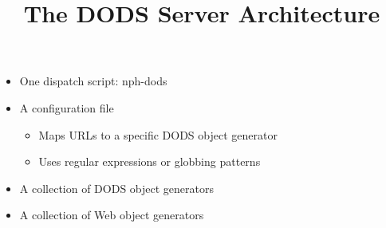 \title{The DODS Server Architecture}

\begin{itemize}
\item One dispatch script: nph-dods
\item A configuration file
\begin{itemize}
\item Maps URLs to a specific DODS object generator
\item Uses regular expressions or globbing patterns
\end{itemize}
\item A collection of DODS object generators
\item A collection of Web object generators
\end{itemize}